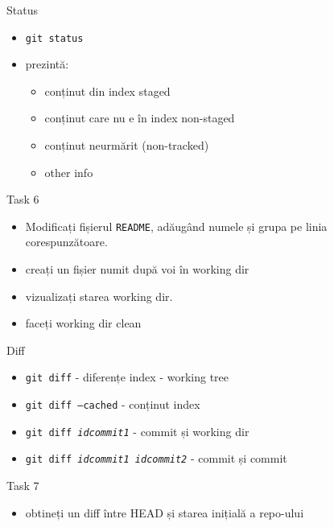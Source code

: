 \documentclass{beamer}
\begin{document}
\begin{frame}{Status}
  \begin{itemize}
    \item \texttt{git status}
    \item prezintă:
      \begin{itemize}
        \item conținut din index {staged}
        \item conținut care nu e în index {non-staged}
        \item conținut neurmărit (non-tracked)
        \item other info
      \end{itemize}
  \end{itemize}
  \pause
  \begin{alertblock}{Task 6}
    \begin{itemize}
      \item Modificați fișierul \texttt{README}, adăugând numele și grupa pe linia
      corespunzătoare.
      \item creați un fișier numit după voi în working dir
      \item vizualizați starea working dir.
      \item faceți working dir clean
    \end{itemize}
  \end{alertblock}
\end{frame}

\begin{frame}{Diff}
  \begin{itemize}
    \item \texttt{git diff} - diferențe index - working tree
    \item \texttt{git diff --cached} - conținut index
    \item \texttt{git diff \textit{idcommit1}} - commit și working dir
    \item \texttt{git diff \textit{idcommit1} \textit{idcommit2}} - commit și
    commit
  \end{itemize}
  \pause
  \begin{alertblock}{Task 7}
    \begin{itemize}
      \item obtineți un diff între HEAD și starea inițială a repo-ului
    \end{itemize}
  \end{alertblock}
\end{frame}
\end{document}
